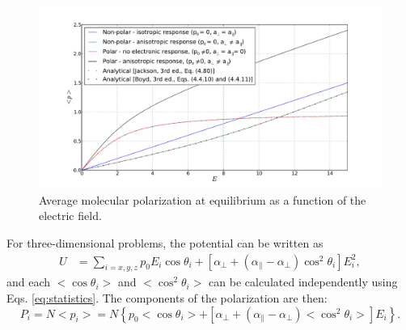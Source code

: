 \documentclass[12pt,letterpaper]{article}
\begin{document}
\begin{figure}
    \includegraphics[width=17.2cm]{static_polarization.pdf}
    \caption{Average molecular polarization at equilibrium as a function of the electric field.}
    \label{fig:stat_pol}
\end{figure} 

For three-dimensional problems, the potential can be written as 
\begin{align}\label{eq:potential_altern}
U &= \sum_{i=x,y,z} p_0E_i\cos\theta_i+\left[\alpha_\bot + (\alpha_\parallel - \alpha_\bot)\cos^2\theta_i\right]E_i^2,
\end{align}
and each $<\cos\theta_i>$ and $<\cos^2\theta_i>$ can be calculated independently using Eqs. \eqref{eq:statistics}. The components of the polarization are then:
\begin{equation}\label{eq:pol_components}
 P_i=N<p_i>=N\left\lbrace p_0<\cos\theta_i>+\left[\alpha_\bot + (\alpha_\parallel - \alpha_\bot)<\cos^2\theta_i>\right]E_i\right\rbrace.
\end{equation}
\end{document}

